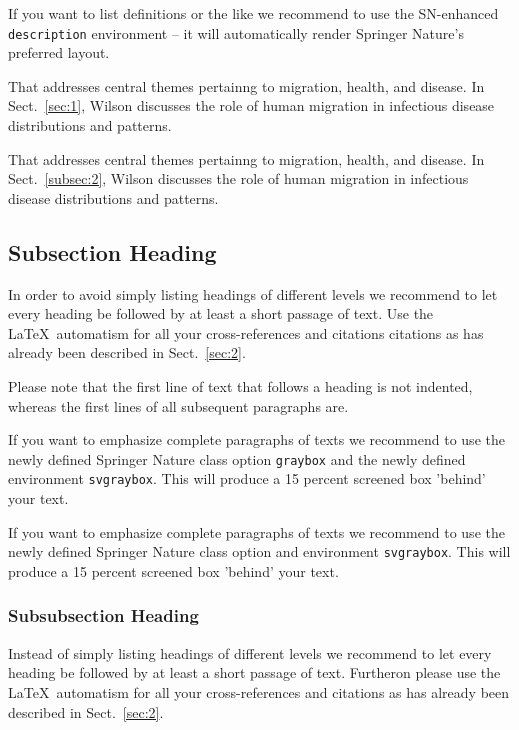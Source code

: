 If you want to list definitions or the like we recommend to use the SN-enhanced \verb|description| environment -- it will automatically render Springer Nature's preferred layout.

\begin{description}[Type 1]
\item[Type 1]{That addresses central themes pertainng to migration, health, and disease. In Sect.~\ref{sec:1}, Wilson discusses the role of human migration in infectious disease distributions and patterns.}
\item[Type 2]{That addresses central themes pertainng to migration, health, and disease. In Sect.~\ref{subsec:2}, Wilson discusses the role of human migration in infectious disease distributions and patterns.}
\end{description}

\subsection{Subsection Heading} %
In order to avoid simply listing headings of different levels we recommend to let every heading be followed by at least a short passage of text. Use the \LaTeX\ automatism for all your cross-references and citations citations as has already been described in Sect.~\ref{sec:2}.

Please note that the first line of text that follows a heading is not indented, whereas the first lines of all subsequent paragraphs are.

\begin{svgraybox}
If you want to emphasize complete paragraphs of texts we recommend to use the newly defined Springer Nature class option \verb|graybox| and the newly defined environment \verb|svgraybox|. This will produce a 15 percent screened box 'behind' your text.

If you want to emphasize complete paragraphs of texts we recommend to use the newly defined Springer Nature class option and environment \verb|svgraybox|. This will produce a 15 percent screened box 'behind' your text.
\end{svgraybox}

\subsubsection{Subsubsection Heading}
Instead of simply listing headings of different levels we recommend to let every heading be followed by at least a short passage of text. Furtheron please use the \LaTeX\ automatism for all your cross-references and citations as has already been described in Sect.~\ref{sec:2}.

